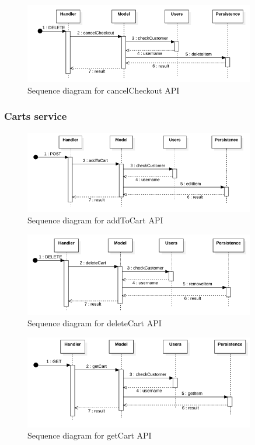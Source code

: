 \begin{figure}[H]
    \includegraphics[width=0.9\textwidth]{res/images/sequence-diagrams/orders/cancelCheckout.png}
    \caption{Sequence diagram for cancelCheckout API}
\end{figure}

\subsubsection{Carts service}

\begin{figure}[H]
    \includegraphics[width=0.9\textwidth]{res/images/sequence-diagrams/carts/addToCart.png}
    \caption{Sequence diagram for addToCart API}
\end{figure}

\begin{figure}[H]
    \includegraphics[width=0.9\textwidth]{res/images/sequence-diagrams/carts/deleteCart.png}
    \caption{Sequence diagram for deleteCart API}
\end{figure}

\begin{figure}[H]
    \includegraphics[width=0.9\textwidth]{res/images/sequence-diagrams/carts/getCart.png}
    \caption{Sequence diagram for getCart API}
\end{figure}

